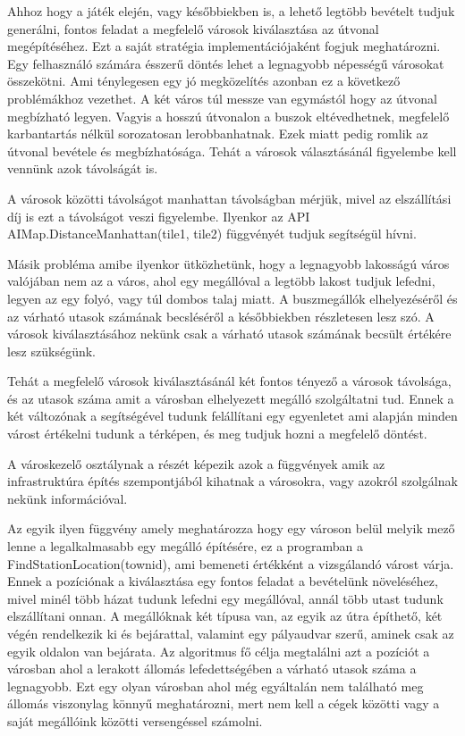 
Ahhoz hogy a játék elején, vagy későbbiekben is, a lehető legtöbb bevételt tudjuk generálni, fontos feladat a megfelelő városok kiválasztása az útvonal megépítéséhez. Ezt a saját stratégia implementációjaként fogjuk meghatározni. Egy felhasználó számára ésszerű döntés lehet a legnagyobb népességű városokat összekötni. Ami ténylegesen egy jó megközelítés azonban ez a következő problémákhoz vezethet. A két város túl messze van egymástól hogy az útvonal megbízható legyen. Vagyis a hosszú útvonalon a buszok eltévedhetnek, megfelelő karbantartás nélkül sorozatosan lerobbanhatnak. Ezek miatt pedig romlik az útvonal bevétele és megbízhatósága. Tehát a városok választásánál figyelembe kell vennünk azok távolságát is.

A városok közötti távolságot manhattan távolságban mérjük, mivel az elszállítási díj is ezt a távolságot veszi figyelembe. Ilyenkor az API AIMap.DistanceManhattan(tile1, tile2) függvényét tudjuk segítségül hívni.

Másik probléma amibe ilyenkor ütközhetünk, hogy a legnagyobb lakosságú város valójában nem az a város, ahol egy megállóval a legtöbb lakost tudjuk lefedni, legyen az egy folyó, vagy túl dombos talaj miatt. A buszmegállók elhelyezéséről és az várható utasok számának becsléséről a későbbiekben részletesen lesz szó. A városok kiválasztásához nekünk csak a várható utasok számának becsült értékére lesz szükségünk.

Tehát a megfelelő városok kiválasztásánál két fontos tényező a városok távolsága, és az utasok száma amit a városban elhelyezett megálló szolgáltatni tud. Ennek a két változónak a segítségével tudunk felállítani egy egyenletet ami alapján minden várost értékelni tudunk a térképen, és meg tudjuk hozni a megfelelő döntést.


A városkezelő osztálynak a részét képezik azok a függvények amik az infrastruktúra építés szempontjából kihatnak a városokra, vagy azokról szolgálnak nekünk információval.

Az egyik ilyen függvény amely meghatározza hogy egy városon belül melyik mező lenne a legalkalmasabb egy megálló építésére, ez a programban a FindStationLocation(townid), ami bemeneti értékként a vizsgálandó várost várja. Ennek a pozíciónak a kiválasztása egy fontos feladat a bevételünk növeléséhez, mivel minél több házat tudunk lefedni egy megállóval, annál több utast tudunk elszállítani onnan. A megállóknak két típusa van, az egyik az útra építhető, két végén rendelkezik ki és bejárattal, valamint egy pályaudvar szerű, aminek csak az egyik oldalon van bejárata. Az algoritmus fő célja megtalálni azt a pozíciót a városban ahol a lerakott állomás lefedettségében a várható utasok száma a legnagyobb. Ezt egy olyan városban ahol még egyáltalán nem található meg állomás viszonylag könnyű meghatározni, mert nem kell a cégek közötti vagy a saját megállóink közötti versengéssel számolni.

